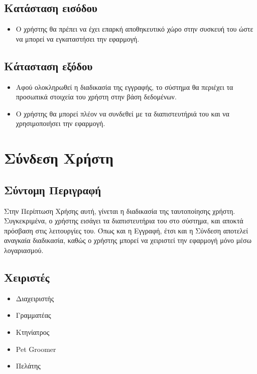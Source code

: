 \documentclass[12pt,a4paper,twoside]{book}
\begin{document}
\subsection{Κατάσταση εισόδου} %
\begin{itemize}
  \item Ο χρήστης θα πρέπει να έχει επαρκή αποθηκευτικό χώρο στην συσκευή του ώστε να μπορεί να εγκαταστήσει την εφαρμογή.%
\end{itemize}

\subsection{Κάτασταση εξόδου} %
\begin{itemize}
  \item Αφού ολοκληρωθεί η διαδικασία της εγγραφής, το σύστημα θα περιέχει τα προσωπικά στοιχεία του χρήστη στην βάση δεδομένων.%
  \item Ο χρήστης θα μπορεί πλέον να συνδεθεί με τα διαπιστευτήριά του και να χρησιμοποιήσει την εφαρμογή. %
\end{itemize}

\section{Σύνδεση Χρήστη} %

\subsection{Σύντομη Περιγραφή}
Στην Περίπτωση Χρήσης αυτή, γίνεται η διαδικασία της ταυτοποίησης χρήστη. Συγκεκριμένα, ο χρήστης εισάγει τα διαπιστευτήρια του στο σύστημα, και αποκτά πρόσβαση στις λειτουργίες του. Όπως και η Εγγραφή, έτσι και η Σύνδεση αποτελεί αναγκαία διαδικασία, καθώς ο χρήστης μπορεί να χειριστεί την εφαρμογή μόνο μέσω λογαριασμού.%

\subsection{Χειριστές}
\begin{itemize}
  \item Διαχειριστής
  \item Γραμματέας
  \item Κτηνίατρος
  \item Pet Groomer
  \item Πελάτης
\end{itemize}
\end{document}
